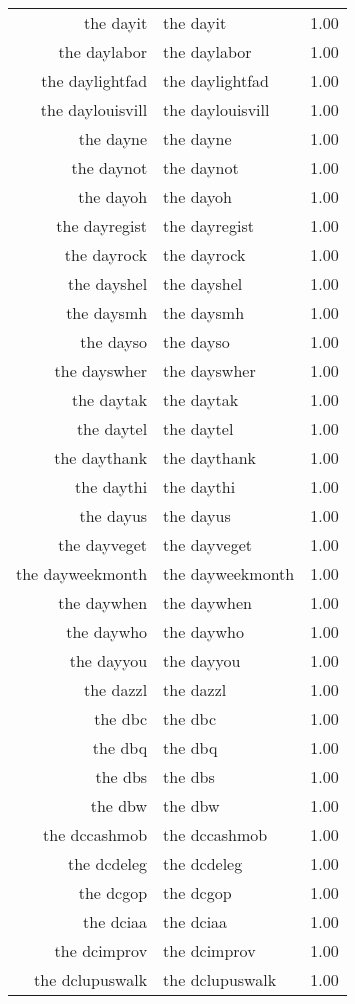 \begin{table}[ht]
\begin{tabular}{rlr}
  the dayit & the dayit & 1.00 \\ 
  the daylabor & the daylabor & 1.00 \\ 
  the daylightfad & the daylightfad & 1.00 \\ 
  the daylouisvill & the daylouisvill & 1.00 \\ 
  the dayne & the dayne & 1.00 \\ 
  the daynot & the daynot & 1.00 \\ 
  the dayoh & the dayoh & 1.00 \\ 
  the dayregist & the dayregist & 1.00 \\ 
  the dayrock & the dayrock & 1.00 \\ 
  the dayshel & the dayshel & 1.00 \\ 
  the daysmh & the daysmh & 1.00 \\ 
  the dayso & the dayso & 1.00 \\ 
  the dayswher & the dayswher & 1.00 \\ 
  the daytak & the daytak & 1.00 \\ 
  the daytel & the daytel & 1.00 \\ 
  the daythank & the daythank & 1.00 \\ 
  the daythi & the daythi & 1.00 \\ 
  the dayus & the dayus & 1.00 \\ 
  the dayveget & the dayveget & 1.00 \\ 
  the dayweekmonth & the dayweekmonth & 1.00 \\ 
  the daywhen & the daywhen & 1.00 \\ 
  the daywho & the daywho & 1.00 \\ 
  the dayyou & the dayyou & 1.00 \\ 
  the dazzl & the dazzl & 1.00 \\ 
  the dbc & the dbc & 1.00 \\ 
  the dbq & the dbq & 1.00 \\ 
  the dbs & the dbs & 1.00 \\ 
  the dbw & the dbw & 1.00 \\ 
  the dccashmob & the dccashmob & 1.00 \\ 
  the dcdeleg & the dcdeleg & 1.00 \\ 
  the dcgop & the dcgop & 1.00 \\ 
  the dciaa & the dciaa & 1.00 \\ 
  the dcimprov & the dcimprov & 1.00 \\ 
  the dclupuswalk & the dclupuswalk & 1.00 \\ 

\end{tabular}
\end{table}
